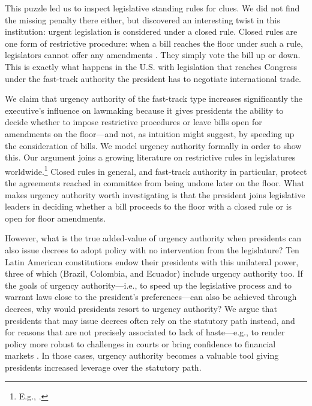 \documentclass[letter,12pt]{article}
\begin{document}
This puzzle led us to inspect legislative standing rules for clues. We did not find the missing penalty there either, but discovered an interesting twist in this institution: urgent legislation is considered under a closed rule. Closed rules are one form of restrictive procedure: when a bill reaches the floor under such a rule, legislators cannot offer any amendments \citep{oleszek.2001}. They simply vote the bill up or down. This is exactly what happens in the U.S. with legislation that reaches Congress under the fast-track authority the president has to negotiate international trade.

We claim that urgency authority of the fast-track type increases significantly the executive's influence on lawmaking because it gives presidents the ability to decide whether to impose restrictive procedures or leave bills open for amendments on the floor---and not, as intuition might suggest, by speeding up the consideration of bills. We model urgency authority formally in order to show this. Our argument joins a growing literature on restrictive rules in legislatures worldwide.\footnote{E.g., \citet{dion.huber.1996,doring.restrictiveRules.2003,huber.1996b,krehbielRestrictiveRules1997,heller.2001,weingast.1992,schickler.richRules1997,cox.mccubbins.1997,amorim.cox.mccubbins.2003,calvo.2014argBook,sin.2014,denhartog.2004phd}.} Closed rules in general, and fast-track authority in particular, protect the agreements reached in committee from being undone later on the floor. What makes urgency authority worth investigating is that the president joins legislative leaders in deciding whether a bill proceeds to the floor with a closed rule or is open for floor amendments.

However, what is the true added-value of urgency authority when presidents can also issue decrees to adopt policy with no intervention from the legislature? Ten Latin American constitutions endow their presidents with this unilateral power, three of which (Brazil, Colombia, and Ecuador) include urgency authority too. If the goals of urgency authority---i.e., to speed up the legislative process and to warrant laws close to the president's preferences---can also be achieved through decrees, why would presidents resort to urgency authority? We argue that presidents that may issue decrees often rely on the statutory path instead, and for reasons that are not precisely associated to lack of haste---e.g., to render policy more robust to challenges in courts or bring confidence to financial markets \citep[cf.][]{palanza.2019}. In those cases, urgency authority becomes a valuable tool giving presidents increased leverage over the statutory path.  
\end{document}

